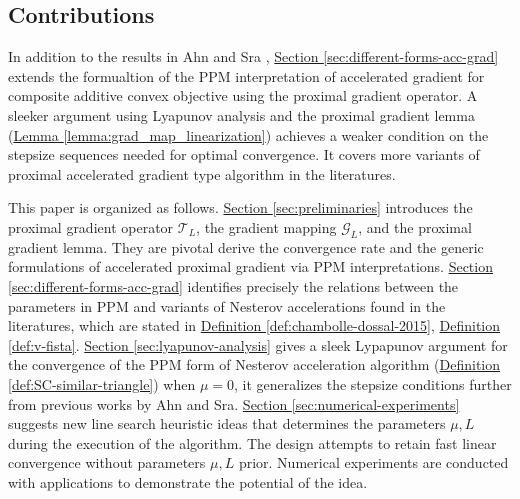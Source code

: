 \documentclass[12pt]{article}
\begin{document}
    \subsection{Contributions}
        \par
        In addition to the results in Ahn and Sra \cite{ahn_understanding_2022}, 
        \hyperref[sec:different-forms-acc-grad]{Section \ref*{sec:different-forms-acc-grad}}
        extends the formualtion of the PPM interpretation of accelerated gradient for composite additive convex objective using the proximal gradient operator. 
        A sleeker argument using Lyapunov analysis and the proximal gradient lemma 
        (\hyperref[lemma:grad_map_linearization]{Lemma \ref*{lemma:grad_map_linearization}}) achieves a weaker condition on the stepsize sequences needed for optimal convergence. 
        It covers more variants of proximal accelerated gradient type algorithm in the literatures. 
        \par
        This paper is organized as follows. 
        \hyperref[sec:preliminaries]{Section \ref*{sec:preliminaries}} introduces the proximal gradient operator $\mathcal T_L$, the gradient mapping $\mathcal G_L$, and the proximal gradient lemma. 
        They are pivotal derive the convergence rate and the generic formulations of accelerated proximal gradient via PPM interpretations. 
        \hyperref[sec:different-forms-acc-grad]{Section \ref*{sec:different-forms-acc-grad}}
        identifies precisely the relations between the parameters in PPM and variants of Nesterov accelerations found in the literatures, which are stated in 
        \hyperref[def:chambolle-dossal-2015]{Definition \ref*{def:chambolle-dossal-2015}}, 
        \hyperref[def:v-fista]{Definition \ref*{def:v-fista}}. 
        \hyperref[sec:lyapunov-analysis]{Section \ref*{sec:lyapunov-analysis}} gives a sleek Lypapunov argument for the convergence of the PPM form of Nesterov acceleration algorithm 
        (\hyperref[def:SC-similar-triangle]{Definition \ref*{def:SC-similar-triangle}}) 
        when $\mu = 0$, it generalizes the stepsize conditions further from previous works by Ahn and Sra. 
        \hyperref[sec:numerical-experiments]{Section \ref*{sec:numerical-experiments}}
        suggests new line search heuristic ideas that determines the parameters $\mu, L$ during the execution of the algorithm. 
        The design attempts to retain fast linear convergence without parameters $\mu, L$ prior.         
        Numerical experiments are conducted with applications to demonstrate the potential of the idea. 
\end{document}
